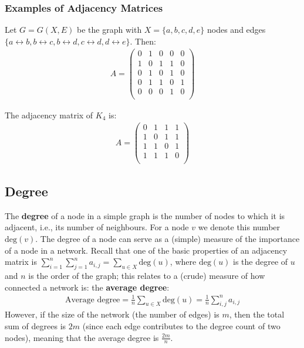 \documentclass[a4paper,11pt]{article}
\begin{document}
\subsubsection{Examples of Adjacency Matrices}
Let $G = G(X,E)$ be the graph with $X = \{a,b,c,d,e\}$ nodes and edges $\{a \leftrightarrow b, b \leftrightarrow c, b \leftrightarrow d, c \leftrightarrow d, d \leftrightarrow e \}$.
Then:
\begin{align*}
    A =
    \begin{pmatrix}
        0 & 1 & 0 & 0 & 0 \\
        1 & 0 & 1 & 1 & 0 \\
        0 & 1 & 0 & 1 & 0 \\
        0 & 1 & 1 & 0 & 1 \\
        0 & 0 & 0 & 1 & 0 \\
    \end{pmatrix}
\end{align*}

The adjacency matrix of $K_4$ is:
\begin{align*}
    A =
    \begin{pmatrix}
        0 & 1 & 1 & 1 \\
        1 & 0 & 1 & 1 \\
        1 & 1 & 0 & 1 \\
        1 & 1 & 1 & 0 \\
    \end{pmatrix}
\end{align*}

\subsection{Degree}
The \textbf{degree} of a node in a simple graph is the number of nodes to which it is adjacent, i.e., its number of neighbours.
For a node $v$ we denote this number $\text{deg}(v)$.
The degree of a node can serve as a (simple) measure of the importance of a node in a network.
Recall that one of the basic properties of an adjacency matrix is $\sum^n_{i=1} \sum^n_{j=1} a_{i,j} = \sum_{u \in X} \text{deg}(u)$, where $\text{deg}(u)$ is the degree of $u$ and $n$ is the order of the graph;
this relates to a (crude) measure of how connected a network is: the \textbf{average degree}:
\begin{align*}
    \text{Average degree} = \frac{1}{n} \sum_{u \in X} \text{deg}(u) = \frac{1}{n}\sum^n_{i,j} a_{i,j}
\end{align*}
However, if the size of the network (the number of edges) is $m$, then the total sum of degrees is $2m$ (since each edge contributes to the degree count of two nodes), meaning that the average degree is $\frac{2m}{n}$.
\end{document}
